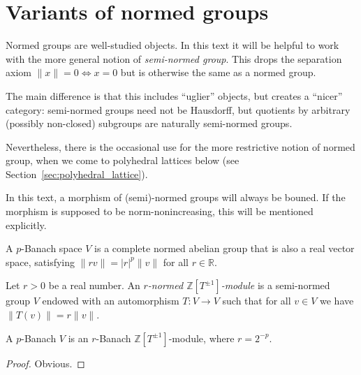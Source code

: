 \section{Variants of normed groups}
\label{sec:normed_groups}

\begin{remark}
  Normed groups are well-studied objects.
  In this text it will be helpful to work with
  the more general notion of \emph{semi-normed group}.
  This drops the separation axiom $\|x\| = 0 \iff x = 0$
  but is otherwise the same as a normed group.

  The main difference is that this includes ``uglier'' objects,
  but creates a ``nicer'' category:
  semi-normed groups need not be Hausdorff,
  but quotients by arbitrary (possibly non-closed) subgroups
  are naturally semi-normed groups.

  Nevertheless, there is the occasional use for the more restrictive
  notion of normed group, when we come to polyhedral lattices below
  (see Section~\ref{sec:polyhedral_lattice}).

  In this text, a morphism of (semi)-normed groups will always be bouned.
  If the morphism is supposed to be norm-nonincreasing,
  this will be mentioned explicitly.
\end{remark}

\begin{definition}
  \label{p-banach}
  \leanok
  A $p$-Banach space $V$ is a complete normed abelian group
  that is also a real vector space,
  satisfying $\|rv\| = |r|^p\|v\|$ for all $r \in \mathbb R$.
\end{definition}

\begin{definition}
  \label{normed_with_aut}
  \leanok
  Let $r > 0$ be a real number.
  An \emph{$r$-normed $\mathbb Z[T^{\pm 1}]$-module}
  is a semi-normed group $V$
  endowed with an automorphism $T \colon V \to V$ such that
  for all $v \in V$ we have $\|T(v)\| = r\|v\|$.
\end{definition}

\begin{lemma}
  \label{p-banach-r-normed}
   A $p$-Banach $V$ is an $r$-Banach $\mathbb Z[T^{\pm 1}]$-module, where $r=2^{-p}$.
\end{lemma}

\begin{proof}
  Obvious.
\end{proof}

